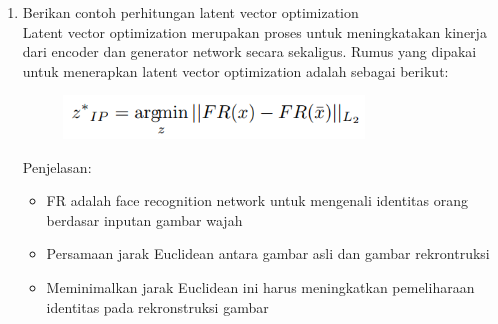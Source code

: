 \begin{enumerate}
    \item Berikan contoh perhitungan latent vector optimization\\
    Latent vector optimization merupakan proses untuk meningkatakan kinerja dari encoder dan generator network secara sekaligus. Rumus yang dipakai untuk menerapkan latent vector optimization adalah sebagai berikut:\\
    \begin{figure}[H]
		\includegraphics[width=8cm]{figures/1174006/chapter9/teori/lvo.png}
		\centering
	\end{figure}
    Penjelasan:
    \begin{itemize}
        \item FR adalah face recognition network untuk mengenali identitas orang berdasar inputan gambar wajah
        \item Persamaan jarak Euclidean antara gambar asli dan gambar rekrontruksi
        \item Meminimalkan jarak Euclidean ini harus meningkatkan pemeliharaan identitas pada rekronstruksi gambar
    \end{itemize}
\end{enumerate}

